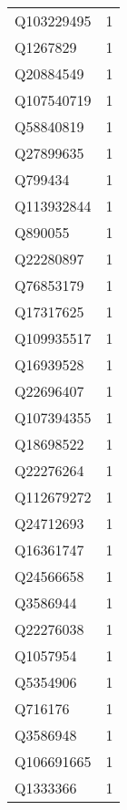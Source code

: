 \begin{tabular}{lr}
  Q103229495 &                             1 \\
    Q1267829 &                             1 \\
   Q20884549 &                             1 \\
  Q107540719 &                             1 \\
   Q58840819 &                             1 \\
   Q27899635 &                             1 \\
     Q799434 &                             1 \\
  Q113932844 &                             1 \\
     Q890055 &                             1 \\
   Q22280897 &                             1 \\
   Q76853179 &                             1 \\
   Q17317625 &                             1 \\
  Q109935517 &                             1 \\
   Q16939528 &                             1 \\
   Q22696407 &                             1 \\
  Q107394355 &                             1 \\
   Q18698522 &                             1 \\
   Q22276264 &                             1 \\
  Q112679272 &                             1 \\
   Q24712693 &                             1 \\
   Q16361747 &                             1 \\
   Q24566658 &                             1 \\
    Q3586944 &                             1 \\
   Q22276038 &                             1 \\
    Q1057954 &                             1 \\
    Q5354906 &                             1 \\
     Q716176 &                             1 \\
    Q3586948 &                             1 \\
  Q106691665 &                             1 \\
    Q1333366 &                             1 \\

\end{tabular}
